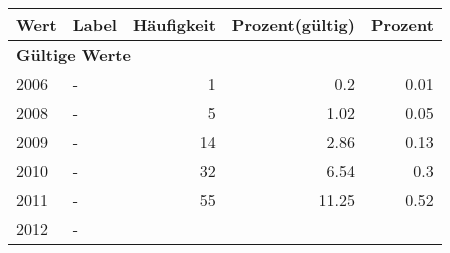      \begin{longtable}{lXrrr}
     \toprule
     \textbf{Wert} & \textbf{Label} & \textbf{Häufigkeit} & \textbf{Prozent(gültig)} & \textbf{Prozent} \\
     \endhead
     \midrule
     \multicolumn{5}{l}{\textbf{Gültige Werte}}\\

     2006 &
     \multicolumn{1}{X}{ -  } &


       \num{1} &
       \num[round-mode=places,round-precision=2]{0,2} &
         \num[round-mode=places,round-precision=2]{0,01} \\

     2008 &
     \multicolumn{1}{X}{ -  } &


       \num{5} &
       \num[round-mode=places,round-precision=2]{1,02} &
         \num[round-mode=places,round-precision=2]{0,05} \\

     2009 &
     \multicolumn{1}{X}{ -  } &


       \num{14} &
       \num[round-mode=places,round-precision=2]{2,86} &
         \num[round-mode=places,round-precision=2]{0,13} \\

     2010 &
     \multicolumn{1}{X}{ -  } &


       \num{32} &
       \num[round-mode=places,round-precision=2]{6,54} &
         \num[round-mode=places,round-precision=2]{0,3} \\

     2011 &
     \multicolumn{1}{X}{ -  } &


       \num{55} &
       \num[round-mode=places,round-precision=2]{11,25} &
         \num[round-mode=places,round-precision=2]{0,52} \\

     2012 &
     \multicolumn{1}{X}{ -  } &



\end{longtable}
